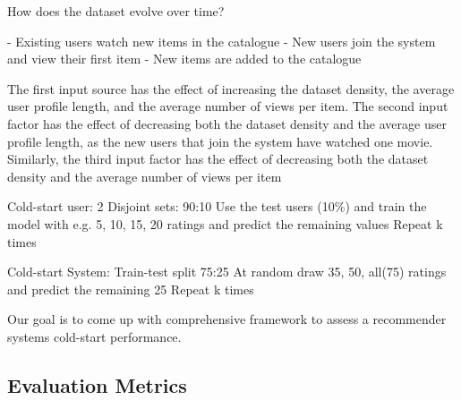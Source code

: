 How does the dataset evolve over time?

	- Existing users watch new items in the catalogue
	- New users join the system and view their first item
	- New items are added to the catalogue
	
The first input source has the effect of increasing the dataset density, the average user profile length, and the 
average number of views per item. The second input factor has the effect of decreasing both the dataset density 
and the average user profile length, as the new users that join the system have watched one movie. Similarly, 
the third input factor has the effect of decreasing both the dataset density and the average number of views per 
item

Cold-start user:
2 Disjoint sets: 90:10
Use the test users (10\%) and train the model with e.g. 5, 10, 15, 20 ratings and predict the remaining values
Repeat k times


Cold-start System:
Train-test split 75:25
At random draw 35, 50, all(75) ratings and predict the remaining 25
Repeat k times


Our goal is to come up with comprehensive framework to assess a recommender systems cold-start performance.










\subsection{Evaluation Metrics}






